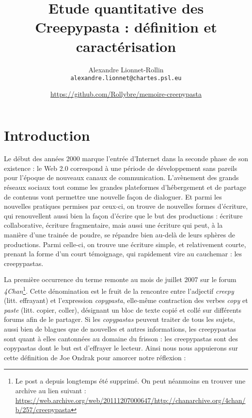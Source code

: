 \documentclass[12pt,a4paper,oneside,titlepage]{article} %
\author{Alexandre Lionnet-Rollin\\
	\texttt{alexandre.lionnet@chartes.psl.eu} \and \url{https://github.com/Rollybre/memoire-creepypasta}}
\title{Etude quantitative des Creepypasta : définition et caractérisation}
\begin{document}
\maketitle

\section*{Introduction}
	Le début des années 2000 marque l'entrée d'Internet dans la seconde phase de son existence : le Web 2.0 correspond à une période de développement sans pareils pour l'époque de nouveaux canaux de communication. L'avènement des grands réseaux sociaux tout comme les grandes plateformes d'hébergement et de partage de contenus vont permettre une nouvelle façon de dialoguer. Et parmi les nouvelles pratiques permises par ceux-ci, on trouve de nouvelles formes d'écriture, qui renouvellent aussi bien la façon d’écrire que le but des productions : écriture collaborative, écriture fragmentaire, mais aussi une écriture qui peut, à la manière d'une trainée de poudre, se répandre bien au-delà de leurs sphères de productions. Parmi celle-ci, on trouve une écriture simple, et relativement courte, prenant la forme d'un court témoignage, qui rapidement vire au cauchemar : les creepypastas. 
	

	\par
	La première occurrence du terme remonte au mois de juillet 2007 sur le forum \emph{4Chan}\footnote{Le post a depuis longtemps été supprimé. On peut néanmoins en trouver une archive au lien suivant : \url{https://web.archive.org/web/20111207000647/http://chanarchive.org/4chan/b/257/creepypasta}}. Cette dénomination est le fruit de la rencontre entre l'adjectif \emph{creepy} (litt. effrayant) et l'expression \emph{copypasta}, elle-même contraction des verbes \emph{copy} et \emph{paste} (litt. copier, coller), désignant un bloc de texte copié et collé sur différents forums afin de le partager. Si les \emph{copypastas} peuvent traiter de tous les sujets, aussi bien de blagues que de nouvelles et autres informations, les creepypastas sont quant à elles cantonnées au domaine du frisson : les creepypastas sont des copypastas dont le but est d'effrayer le lecteur. Ainsi nous nous appuierons sur cette définition de Joe Ondrak pour amorcer notre réflexion : 
\end{document}
